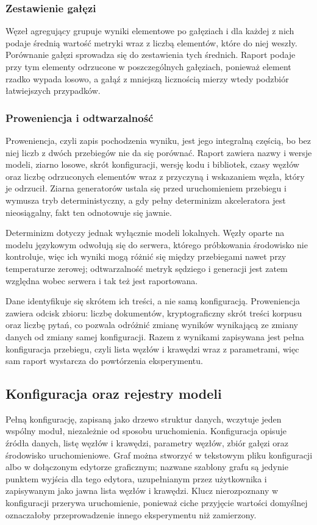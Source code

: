 \subsubsection{Zestawienie gałęzi}
Węzeł agregujący grupuje wyniki elementowe po gałęziach i dla każdej z nich podaje średnią wartość
metryki wraz z liczbą elementów, które do niej weszły. Porównanie gałęzi sprowadza się do
zestawienia tych średnich. Raport podaje przy tym elementy odrzucone w poszczególnych gałęziach,
ponieważ element rzadko wypada losowo, a gałąź z mniejszą licznością mierzy wtedy podzbiór
łatwiejszych przypadków.

\subsubsection{Proweniencja i odtwarzalność}
Proweniencja, czyli zapis pochodzenia wyniku, jest jego integralną częścią, bo bez niej liczb z
dwóch przebiegów nie da się porównać. Raport zawiera nazwy i wersje modeli, ziarno losowe, skrót
konfiguracji, wersję kodu i bibliotek, czasy węzłów oraz liczbę odrzuconych elementów wraz z
przyczyną i wskazaniem węzła, który je odrzucił. Ziarna generatorów ustala się przed
uruchomieniem przebiegu i wymusza tryb deterministyczny, a gdy pełny determinizm akceleratora jest
nieosiągalny, fakt ten odnotowuje się jawnie.

Determinizm dotyczy jednak wyłącznie modeli lokalnych. Węzły oparte na modelu
językowym odwołują się do serwera, którego próbkowania środowisko nie kontroluje, więc ich wyniki
mogą różnić się między przebiegami nawet przy temperaturze zerowej; odtwarzalność metryk sędziego
i generacji jest zatem względna wobec serwera i tak też jest raportowana.

Dane identyfikuje się skrótem ich treści, a nie samą konfiguracją. Proweniencja zawiera odcisk
zbioru: liczbę dokumentów, kryptograficzny skrót treści korpusu oraz liczbę pytań, co pozwala
odróżnić zmianę wyników wynikającą ze zmiany danych od zmiany samej konfiguracji. Razem z
wynikami zapisywana jest pełna konfiguracja przebiegu, czyli lista węzłów i krawędzi wraz z
parametrami, więc sam raport wystarcza do powtórzenia eksperymentu.

\subsection{Konfiguracja oraz rejestry modeli}
\label{sec:rejestry}
Pełną konfigurację, zapisaną jako drzewo struktur danych, wczytuje jeden wspólny moduł,
niezależnie od sposobu uruchomienia. Konfiguracja opisuje źródła danych, listę węzłów i krawędzi,
parametry węzłów, zbiór gałęzi oraz środowisko uruchomieniowe. Graf można stworzyć w tekstowym
pliku konfiguracji albo w dołączonym edytorze graficznym; nazwane szablony grafu są jedynie
punktem wyjścia dla tego edytora, uzupełnianym przez użytkownika i zapisywanym jako jawna lista
węzłów i krawędzi. Klucz nierozpoznany w konfiguracji przerywa uruchomienie, ponieważ ciche
przyjęcie wartości domyślnej oznaczałoby przeprowadzenie innego eksperymentu niż zamierzony.

